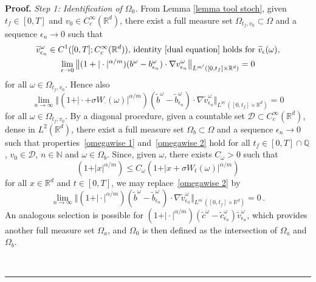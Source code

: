 \documentclass[a4paper,10pt]{article}
\newenvironment{proof}[1][Proof]{\noindent\textbf{#1.} }{\ \rule{0.5em}{0.5em}}
\begin{document}
\begin{proof}
\emph{Step 1: Identification of $\Omega_{0}$.} From Lemma
\ref{lemma tool stoch}, given $t_{f}\in [0,T]$ and $v_{0}\in
C_{c}^{\infty}(\mathbb{R}^{d})$, there exist a full measure set $\Omega_{t_{f},v_{0}} 
\subset\Omega$ and a sequence $\epsilon_{n}\rightarrow0$ such that 
\begin{gather}
\widetilde{v}_{\epsilon_{n}}^\omega  \in C^{1}([0,T];C_{c}^{\infty}(\mathbb{R}^{d}))  \text{, identity
} \eqref{dual equation} \text{ holds for~}\widetilde{v}_{\epsilon}(
\omega),  \label{omegawise 1} \\
\lim_{\epsilon\rightarrow0} \big\Vert (1+\vert \cdot \vert^{\alpha/m}) (b^\omega  -b_{\epsilon_{n}}^\omega ) \cdot \nabla v_{\epsilon_{n}}^\omega
\big\Vert _{L^{m^{\prime}}([0,t_{f}] \times \mathbb{R}^{d})  }=0 \nonumber
\end{gather}
for all $\omega\in\Omega_{t_{f},v_{0}}$. Hence also
\begin{equation}
\lim_{n\rightarrow\infty} \big\Vert ( 1+ \vert \cdot+\sigma
W_{\cdot}(\omega) \vert^{\alpha/m}) (\widetilde{b}^\omega  -\widetilde{b}_{\epsilon_{n}}^\omega ) \cdot\nabla\widetilde{v}_{\epsilon_{n}}^\omega  \big\Vert_{L^{m^{\prime}}([0,t_{f}] \times \mathbb{R}^{d})}=0\label{omegawise 2} 
\end{equation}
for all $\omega\in\Omega_{t_{f},v_{0}}$. 
By a diagonal procedure, given a
countable set $\mathcal{D}\subset C_{c}^{\infty}(\mathbb{R}^{d})$, dense in $L^{2}(\mathbb{R}^{d})$, there exist a full measure set $\Omega_{b}\subset\Omega$ and a sequence $\epsilon_{n}\rightarrow0$ such that properties~\eqref{omegawise 1} and~\eqref{omegawise 2} hold for all $t_{f}\in [0,T]  \cap\mathbb{Q}$,
$v_{0}\in\mathcal{D}$, $n\in\mathbb{N}$ and $\omega\in\Omega_{b}$.
Since, given $\omega$, there exists $C_\omega>0$ such that
\[
( 1+ \vert x \vert^{\alpha/m} )\leq C_{\omega} (1+ \vert x+\sigma W_{t}(\omega) \vert ^{\alpha/m} )
\]
for all $x\in\mathbb{R}^{d}$ and $t\in [0,T]  $, we may replace~\eqref{omegawise 2} by
\begin{equation}
\lim_{n\rightarrow\infty}\big\Vert ( 1+ \vert \cdot \vert
^{\alpha/m}) ( \widetilde{b}^\omega -\widetilde{b}_{\epsilon_{n}}^\omega)  \cdot\nabla\widetilde{v}_{\epsilon_{n}}^\omega \big\Vert _{L^{m^{\prime}}(
[0,t_{f}] \times \mathbb{R}^{d}) } = 0\label{omegawise 2 bis} \,.
\end{equation}
An analogous selection is possible for $( 1+ \vert \cdot \vert^{\alpha/m}) ( \widetilde{c}^\omega -\widetilde{c}_{\epsilon_{n}}^\omega ) \widetilde{v}_{\epsilon_{n}}^\omega$, which provides another full measure set $\Omega_a$, and $\Omega_0$ is then defined as the intersection of $\Omega_a$ and $\Omega_b$.


\end{proof}
\end{document}

